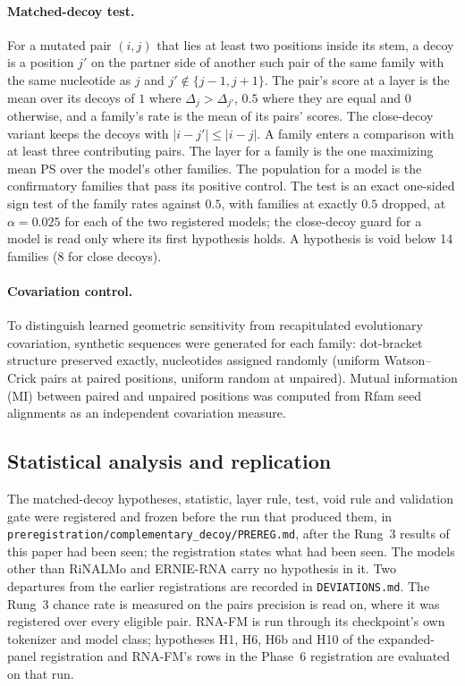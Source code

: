 \documentclass[11pt]{article}
\begin{document}
\paragraph{Matched-decoy test.}
\label{sec:decoy-method}
For a mutated pair $(i, j)$ that lies at least two positions inside its stem,
a decoy is a position $j'$ on the partner side of another such pair of the
same family with the same nucleotide as $j$ and $j' \notin \{j-1, j+1\}$. The
pair's score at a layer is the mean over its decoys of $1$ where
$\Delta_j > \Delta_{j'}$, $0.5$ where they are equal and $0$ otherwise, and a
family's rate is the mean of its pairs' scores. The close-decoy variant keeps
the decoys with $|i - j'| \leq |i - j|$. A family enters a comparison with at
least three contributing pairs. The layer for a family is the one maximizing
mean PS over the model's other families. The population for a model is the
confirmatory families that pass its positive control. The test is an exact
one-sided sign test of the family rates against $0.5$, with families at exactly
$0.5$ dropped, at $\alpha = 0.025$ for each of the two registered models; the
close-decoy guard for a model is read only where its first hypothesis holds. A
hypothesis is void below 14 families (8 for close decoys).

\paragraph{Covariation control.}
To distinguish learned geometric sensitivity from recapitulated evolutionary
covariation, synthetic sequences were generated for each family: dot-bracket
structure preserved exactly, nucleotides assigned randomly (uniform
Watson--Crick pairs at paired positions, uniform random at unpaired). Mutual
information (MI) between paired and unpaired positions was computed from Rfam
seed alignments as an independent covariation measure.

\subsection{Statistical analysis and replication}
\label{sec:stats}

The matched-decoy hypotheses, statistic, layer rule, test, void rule and
validation gate were registered and frozen before the run that produced them,
in \texttt{preregistration/\allowbreak{}complementary\_decoy/\allowbreak{}PREREG.md}, after the Rung~3
results of this paper had been seen; the registration states what had been
seen. The models other than RiNALMo and ERNIE-RNA carry no hypothesis in it.
Two departures from the earlier registrations are recorded in
\texttt{DEVIATIONS.md}. The Rung~3 chance rate is measured on the pairs
precision is read on, where it was registered over every eligible pair. RNA-FM
is run through its checkpoint's own tokenizer and model class; hypotheses H1,
H6, H6b and H10 of the expanded-panel registration and RNA-FM's rows in the
Phase~6 registration are evaluated on that run.
\end{document}
